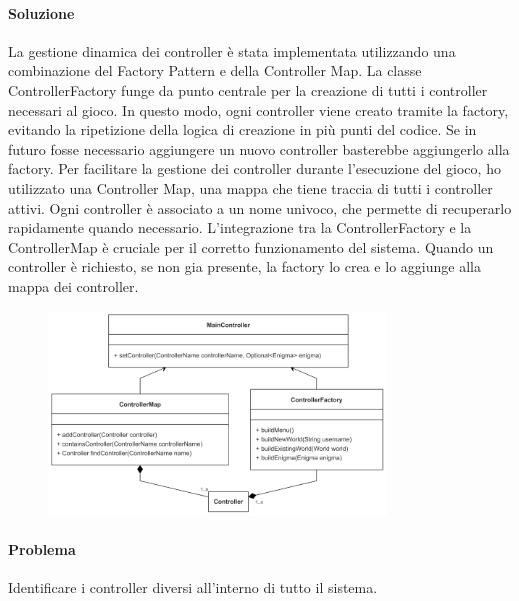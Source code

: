 \documentclass[a4paper,12pt]{report}
\begin{document}
\paragraph{Soluzione} La gestione dinamica dei controller è stata implementata utilizzando una combinazione del Factory Pattern e della Controller Map. La classe ControllerFactory funge da punto centrale per la creazione di tutti i controller necessari al gioco. In questo modo, ogni controller viene creato tramite la factory, evitando la ripetizione della logica di creazione in più punti del codice. Se in futuro fosse necessario aggiungere un nuovo controller basterebbe aggiungerlo alla factory. Per facilitare la gestione dei controller durante l’esecuzione del gioco, ho utilizzato una Controller Map, una mappa che tiene traccia di tutti i controller attivi. Ogni controller è associato a un nome univoco, che permette di recuperarlo rapidamente quando necessario. L’integrazione tra la ControllerFactory e la ControllerMap è cruciale per il corretto funzionamento del sistema. Quando un controller è richiesto, se non gia presente, la factory lo crea e lo aggiunge alla mappa dei controller.
%
\begin{figure}[h]  %
    \centering
    \includegraphics[width=0.8\textwidth]{img/maincontroller.png}  %
    \label{img:maincontroller}
\end{figure}

\paragraph{Problema} Identificare i controller diversi all’interno di tutto il sistema.
\end{document}
